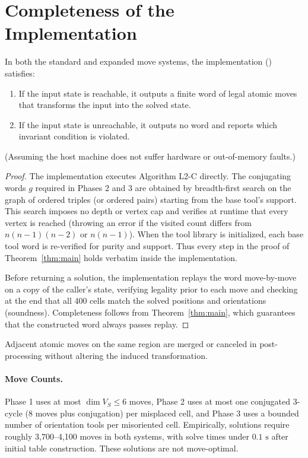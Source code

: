 \documentclass[a4paper,11pt]{article}
\begin{document}
\section{Completeness of the Implementation}\label{sec:impl}

\begin{theorem}\label{thm:impl}
In both the standard and expanded move systems, the implementation  () satisfies:
\begin{enumerate}
\item If the input state is reachable, it outputs a finite word of legal atomic moves that transforms the input into the solved state.
\item If the input state is unreachable, it outputs no word and reports which invariant condition is violated.
\end{enumerate}
(Assuming the host machine does not suffer hardware or out-of-memory faults.)
\end{theorem}

\begin{proof}
The implementation executes Algorithm L2-C directly.
The conjugating words $g$ required in Phases 2 and 3 are obtained by breadth-first search on the graph of ordered triples (or ordered pairs) starting from the base tool's support.
This search imposes no depth or vertex cap and verifies at runtime that every vertex is reached (throwing an error if the visited count differs from $n(n-1)(n-2)$ or $n(n-1)$).
When the tool library is initialized, each base tool word is re-verified for purity and support.
Thus every step in the proof of Theorem~\ref{thm:main} holds verbatim inside the implementation.

Before returning a solution, the implementation replays the word move-by-move on a copy of the caller's state, verifying legality prior to each move and checking at the end that all 400 cells match the solved positions and orientations (soundness).
Completeness follows from Theorem~\ref{thm:main}, which guarantees that the constructed word always passes replay.
\end{proof}

Adjacent atomic moves on the same region are merged or canceled in post-processing without altering the induced transformation.

\paragraph{Move Counts.}
Phase 1 uses at most $\dim V_S\le6$ moves, Phase 2 uses at most one conjugated 3-cycle (8 moves plus conjugation) per misplaced cell, and Phase 3 uses a bounded number of orientation tools per misoriented cell.
Empirically, solutions require roughly 3,700--4,100 moves in both systems, with solve times under $0.1\text{ s}$ after initial table construction.
These solutions are not move-optimal.
\end{document}
